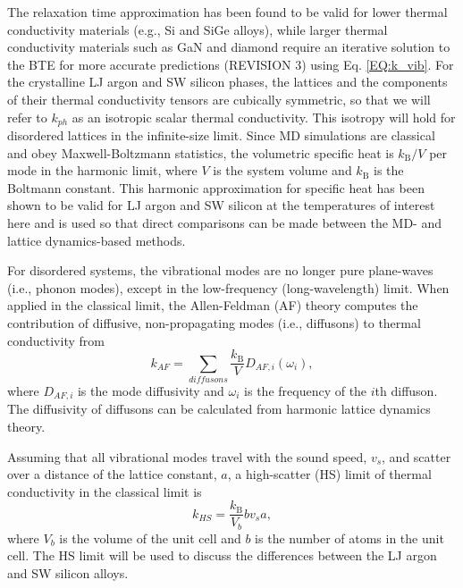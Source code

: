 \documentclass[aps,prb,onecolumn,preprint,footinbib,superscriptaddress,amsmath,amssymb,floatfix]{revtex4}
\begin{document}
The relaxation time approximation has been found to be valid  
for lower thermal conductivity materials 
(e.g., Si and SiGe alloys),
\cite{broido_intrinsic_2007,ward_intrinsic_2010,garg_role_2011} 
while larger thermal conductivity 
materials such as GaN and diamond require an  
iterative solution to the BTE for more accurate predictions 
(REVISION 3) using Eq. \eqref{EQ:k_vib}. 
\cite{ward_ab_2009,lindsay_thermal_2012} 
For the crystalline LJ argon and SW silicon phases, 
the lattices and the components of their 
thermal conductivity tensors are cubically symmetric, 
so that we will refer to 
$k_{ph}$ as an isotropic scalar thermal conductivity. 
This isotropy will hold for disordered lattices 
in the infinite-size limit. 
Since MD simulations are classical 
and obey Maxwell-Boltzmann 
statistics,\cite{mcquarrie_statistical_2000} the volumetric 
specific heat is $k_{\text{B}}/V$ per mode in the harmonic limit, where $V$ 
is the system volume and $k_{\text{B}}$ is the Boltmann constant. 
This harmonic approximation for specific heat has been shown to be valid 
for LJ argon and SW silicon at the temperatures of interest here
\cite{mcgaughey_quantitative_2004,goicochea_thermal_2010} 
and is used so that direct comparisons can be made between 
the MD- and lattice dynamics-based methods.

For disordered systems, the vibrational modes are no 
longer pure plane-waves (i.e., phonon modes), except in the low-frequency 
(long-wavelength) limit. When applied in the classical limit, 
the Allen-Feldman (AF) theory computes 
the contribution of diffusive, non-propagating modes (i.e., diffusons) 
to thermal conductivity from\cite{allen_thermal_1993} 
\begin{equation}\label{EQ:M:k_AF}
k_{AF} = \sum_{diffusons} \frac{k_{\text{B}}}{V} D_{AF,i}(\omega_i),
\end{equation}
where $D_{AF,i}$ is the mode diffusivity and $\omega_i$ is the 
frequency of the $i$th diffuson. The diffusivity of diffusons 
can be calculated from harmonic lattice dynamics theory.
\cite{allen_thermal_1993,feldman_thermal_1993,feldman_numerical_1999} 

Assuming that all vibrational modes travel with the sound speed, $v_s$, and 
scatter over a distance of the lattice constant, $a$, 
a high-scatter (HS) limit of thermal conductivity in the classical 
limit is\cite{cahill_lattice_1988} 
\begin{equation}\label{EQ:M:k_AF,HS}
k_{HS} = \frac{k_{\text{B}}}{V_b}b v_s a,
\end{equation}
where $V_b$ is the volume of the unit cell and $b$ is the number of atoms 
in the unit cell. The HS limit will be used to 
discuss the differences between the LJ argon and SW silicon alloys. 
\end{document}
